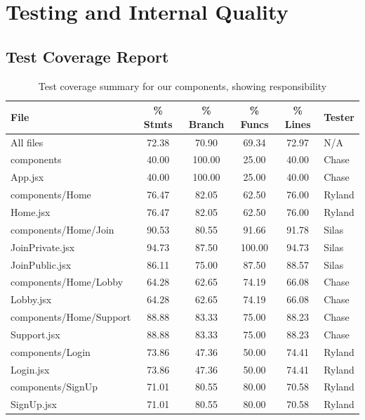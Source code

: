 \documentclass[12pt]{article}
\begin{document}
\newpage
\section{Testing and Internal Quality}

\subsection{Test Coverage Report}

\begin{table}[H]
\centering
\begin{tabular}{|l|c|c|c|c|l|}
\hline
\textbf{File} & \textbf{\% Stmts} & \textbf{\% Branch} & \textbf{\% Funcs} & \textbf{\% Lines} & \textbf{Tester} \\ \hline
All files                & 72.38  & 70.90  & 69.34  & 72.97  & N/A \\ \hline
components               & 40.00  & 100.00 & 25.00  & 40.00  & Chase \\ \hline
\hspace{1em}App.jsx      & 40.00  & 100.00 & 25.00  & 40.00  & Chase \\ \hline
components/Home          & 76.47  & 82.05  & 62.50  & 76.00  & Ryland \\ \hline
\hspace{1em}Home.jsx     & 76.47  & 82.05  & 62.50  & 76.00  & Ryland \\ \hline
components/Home/Join     & 90.53  & 80.55  & 91.66  & 91.78  & Silas \\ \hline
\hspace{1em}JoinPrivate.jsx & 94.73  & 87.50  & 100.00  & 94.73 & Silas \\ \hline
\hspace{1em}JoinPublic.jsx  & 86.11  & 75.00  & 87.50  & 88.57 & Silas \\ \hline
components/Home/Lobby    & 64.28  & 62.65  & 74.19  & 66.08  & Chase \\ \hline
\hspace{1em}Lobby.jsx    & 64.28  & 62.65  & 74.19  & 66.08  & Chase \\ \hline
components/Home/Support  & 88.88  & 83.33  & 75.00  & 88.23  & Chase \\ \hline
\hspace{1em}Support.jsx  & 88.88  & 83.33  & 75.00  & 88.23  & Chase \\ \hline
components/Login         & 73.86  & 47.36  & 50.00  & 74.41  & Ryland \\ \hline
\hspace{1em}Login.jsx    & 73.86  & 47.36  & 50.00  & 74.41  & Ryland \\ \hline
components/SignUp        & 71.01  & 80.55  & 80.00  & 70.58  & Ryland \\ \hline
\hspace{1em}SignUp.jsx   & 71.01  & 80.55  & 80.00  & 70.58  & Ryland \\ \hline
\end{tabular}
\caption{Test coverage summary for our components, showing responsibility}
\label{table:test-coverage-responsibility}
\end{table}
\end{document}
